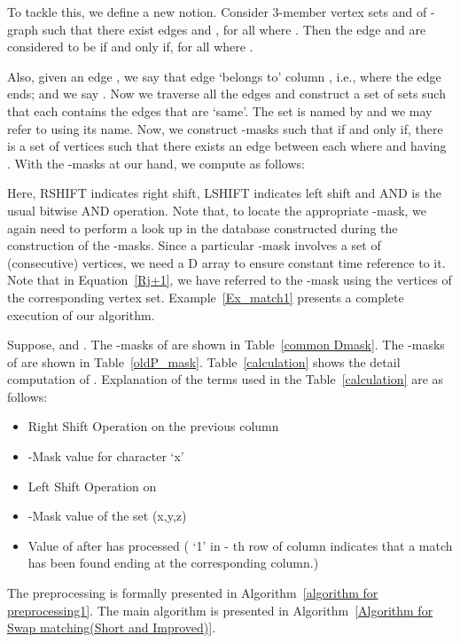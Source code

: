 \documentclass{llncs}
\begin{document}
{To tackle this, we define a new notion. Consider 3-member vertex sets  and  of -graph such that there exist edges  and , for all  where . Then the edge  and  are considered to be  if and only if,  for all  where .


Also, given an edge , we say
that edge  `belongs to' column , i.e., where the edge
ends; and we say . Now we traverse all the edges and construct a set of sets
 such that each  contains the edges that are `same'. The set  is named by
 and we may refer to 
using its name. Now, we construct -masks  such that  if and only if, there is a set of  vertices  such that there exists an edge between each  where  and  having . With the -masks at our hand, we compute  as follows:



Here, RSHIFT indicates right shift, LSHIFT indicates left shift and AND is the usual bitwise AND operation. Note that, to locate the appropriate -mask, we again need to perform a look up in the database constructed during the construction of the -masks. Since a particular -mask involves a set of  (consecutive) vertices, we need a D array to ensure constant time reference to it. Note that in Equation~\ref{Rj+1}, we have referred to the -mask using the  vertices of the corresponding vertex set. Example~\ref{Ex_match1} presents a complete execution of our algorithm.

\begin{example}\label{Ex_match1}
Suppose,  and . The -masks of
 are shown in Table~\ref{common Dmask}. The -masks of
 are shown in Table~\ref{oldP_mask}. Table~\ref{calculation} shows the detail computation of . Explanation of the terms used in the Table~\ref{calculation} are as follows:   

\begin{itemize}
\item[] Right Shift Operation on the previous column
\item[] -Mask value for character `x'
\item[ ] Left Shift Operation on 
\item[] -Mask value of the set (x,y,z)
\item[] Value of  after  has processed ( `1' in - th row of  column indicates that a match has been found ending at the corresponding column.)
\end{itemize}
\end{example}
The preprocessing is formally presented in Algorithm~\ref{algorithm for preprocessing1}. The main algorithm is presented in Algorithm~\ref{Algorithm for Swap matching(Short and Improved)}. 


}
\end{document}
